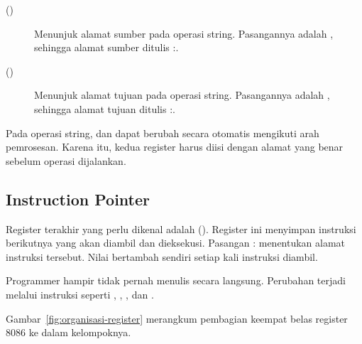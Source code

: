 \begin{description}
    \item[ ()] Menunjuk alamat sumber pada
          operasi string. Pasangannya adalah , sehingga
          alamat sumber ditulis :.

    \item[ ()] Menunjuk alamat tujuan
          pada operasi string. Pasangannya adalah , sehingga
          alamat tujuan ditulis :.
\end{description}

Pada operasi string,  dan  dapat berubah secara
otomatis mengikuti arah pemrosesan. Karena itu, kedua register harus
diisi dengan alamat yang benar sebelum operasi dijalankan.

\subsection{Instruction Pointer}

Register terakhir yang perlu dikenal adalah 
(). Register ini menyimpan 
instruksi berikutnya yang akan diambil dan dieksekusi. Pasangan
: menentukan alamat instruksi tersebut. Nilai
 bertambah sendiri setiap kali instruksi diambil.

Programmer hampir tidak pernah menulis  secara langsung.
Perubahan  terjadi melalui instruksi seperti ,
, , dan .

Gambar~\ref{fig:organisasi-register} merangkum pembagian keempat
belas register 8086 ke dalam kelompoknya.

